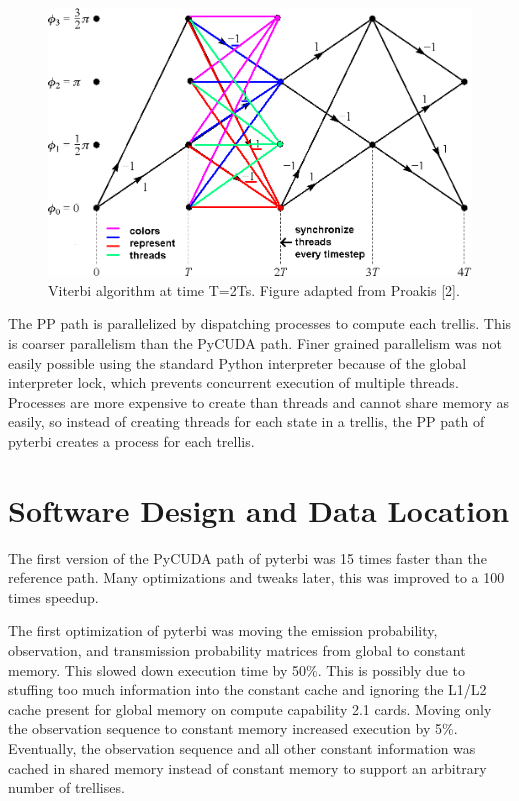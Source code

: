 \documentclass[journal,onecolumn]{IEEEtran}
\begin{document}
        \begin{figure}
            \includegraphics[width=.8\textwidth]{figures/cpmfulltrelliscolored.png}
            \caption{Viterbi algorithm at time T=2Ts. Figure adapted from Proakis [2].}
            \label{fig:cpm}
        \end{figure}

The PP path is parallelized by dispatching processes to compute each trellis. This is coarser parallelism than the PyCUDA path. Finer grained parallelism was not easily possible using the standard Python interpreter because of the global interpreter lock, which prevents concurrent execution of multiple threads. Processes are more expensive to create than threads and cannot share memory as easily, so instead of creating threads for each state in a trellis, the PP path of pyterbi creates a process for each trellis.    

\section{Software Design and Data Location}
The first version of the PyCUDA path of pyterbi was 15 times faster than the reference path. Many optimizations and tweaks later, this was improved to a 100 times speedup. 
        
The first optimization of pyterbi was moving the emission probability, observation, and transmission probability matrices from global to constant memory. This slowed down execution time by 50\%. This is possibly due to stuffing too much information into the constant cache and ignoring the L1/L2 cache present for global memory on compute capability 2.1 cards. Moving only the observation sequence to constant memory increased execution by 5\%. Eventually, the observation sequence and all other constant information was cached in shared memory instead of constant memory to support an arbitrary number of trellises.
\end{document}
